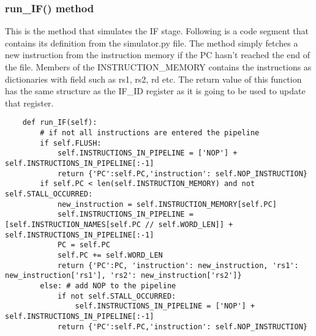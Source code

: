 \subsubsection{run\_IF() method}
This is the method that simulates the IF stage. Following is a code segment that contains its definition from the simulator.py file. The method simply fetches a new instruction from the instruction memory if the PC hasn't reached the end of the file. Members of the INSTRUCTION\_MEMORY contains the instructions as dictionaries with field such as rs1, rs2, rd etc. The return value of this function has the same structure as the IF\_ID register as it is going to be used to update that register.

\vspace{0.5 cm}
\begin{lstlisting}
    def run_IF(self):
        # if not all instructions are entered the pipeline
        if self.FLUSH:
            self.INSTRUCTIONS_IN_PIPELINE = ['NOP'] + self.INSTRUCTIONS_IN_PIPELINE[:-1]
            return {'PC':self.PC,'instruction': self.NOP_INSTRUCTION}
        if self.PC < len(self.INSTRUCTION_MEMORY) and not self.STALL_OCCURRED:
            new_instruction = self.INSTRUCTION_MEMORY[self.PC]
            self.INSTRUCTIONS_IN_PIPELINE = [self.INSTRUCTION_NAMES[self.PC // self.WORD_LEN]] + self.INSTRUCTIONS_IN_PIPELINE[:-1]
            PC = self.PC 
            self.PC += self.WORD_LEN
            return {'PC':PC, 'instruction': new_instruction, 'rs1': new_instruction['rs1'], 'rs2': new_instruction['rs2']}
        else: # add NOP to the pipeline
            if not self.STALL_OCCURRED:
                self.INSTRUCTIONS_IN_PIPELINE = ['NOP'] + self.INSTRUCTIONS_IN_PIPELINE[:-1]
            return {'PC':self.PC,'instruction': self.NOP_INSTRUCTION}
\end{lstlisting}

